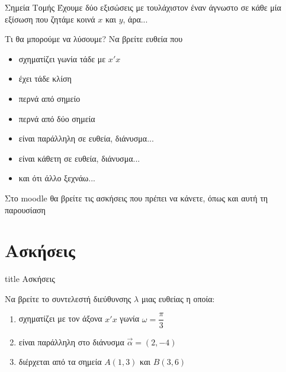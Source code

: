 \documentclass{../../presentation}
\begin{document}
\begin{frame}{Σημεία Τομής}
  Έχουμε δύο εξισώσεις με τουλάχιστον έναν άγνωστο σε κάθε μία εξίσωση που ζητάμε κοινά $x$ και $y$, άρα...
\end{frame}

\begin{frame}{Τι θα μπορούμε να λύσουμε?}
  Να βρείτε ευθεία που
  \begin{itemize}[<+->]
    \item σχηματίζει γωνία τάδε με $x'x$
    \item έχει τάδε κλίση
    \item περνά από σημείο
    \item περνά από δύο σημεία
    \item είναι παράλληλη σε ευθεία, διάνυσμα...
    \item είναι κάθετη σε ευθεία, διάνυσμα...
    \item και ότι άλλο ξεχνάω...
  \end{itemize}
\end{frame}

\begin{frame}[noframenumbering]
  Στο moodle θα βρείτε τις ασκήσεις που πρέπει να κάνετε, όπως και αυτή τη παρουσίαση
\end{frame}

\section{Ασκήσεις}

\begin{frame}[noframenumbering]
  \vfill
  \centering
  \begin{beamercolorbox}[sep=8pt,center,shadow=true,rounded=true]{title}
    Ασκήσεις
  \end{beamercolorbox}
  \vfill
\end{frame}

\begin{askisi}
  Να βρείτε το συντελεστή διεύθυνσης $λ$ μιας ευθείας η οποία:
  \begin{enumerate}[<+->]
    \item σχηματίζει με τον άξονα $x'x$ γωνία $ω=\dfrac{π}{3}$
    \item είναι παράλληλη στο διάνυσμα $\vec{α}=(2,-4)$
    \item διέρχεται από τα σημεία $Α(1,3)$ και $Β(3,6)$
  \end{enumerate}
\end{askisi}
\end{document}
